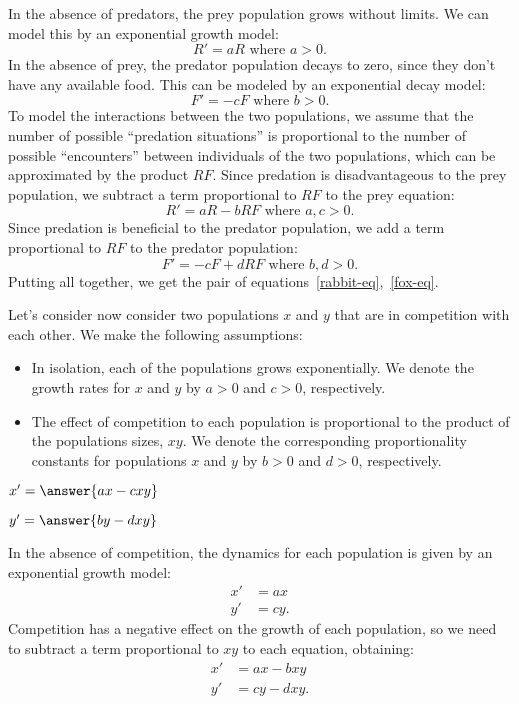 \documentclass{ximera}
\begin{document}
In the absence of predators, the prey population grows without limits. We can model this by an exponential growth model:
\[
R'=aR\text{ where $a>0$}.
\]
In the absence of prey, the predator population decays to zero, since they don't have any available food. This can be modeled by an exponential decay model:
\[
F'=-cF\text{ where $b>0$.}
\]
To model the interactions between the two populations, we assume that the number of possible ``predation situations'' is proportional to the number of possible ``encounters'' between individuals of the two populations, which can be approximated by the product $RF$.
Since predation is disadvantageous to the prey population, we subtract a term proportional to $RF$ to the prey equation:
\[
R'=aR-bRF\text{ where $a,c>0$}.
\]
Since predation is beneficial to the predator population, we add a term proportional to $RF$ to the predator population:
\[
F'=-cF+dRF\text{ where $b,d>0$.}
\]
Putting all together, we get the pair of equations~\ref{rabbit-eq},~\ref{fox-eq}.

\begin{problem}

Let's consider now consider two populations $x$ and $y$ that are in competition with each other. We make the following assumptions:
\begin{itemize}
\item In isolation, each of the populations grows exponentially. We denote the growth rates for $x$ and $y$ by $a>0$ and $c>0$, respectively. 
\item The effect of competition to each population is proportional to the product of the populations sizes, $xy$. We denote the corresponding proportionality constants for populations $x$ and $y$ by $b>0$ and $d>0$, respectively.
\end{itemize}

\begin{question}
$x'= \answer{ax-cxy}$
\end{question}
\begin{question}
$y'= \answer{by-dxy}$
\end{question}
\end{problem}

\begin{explanation} 
In the absence of competition, the dynamics for each population is given by an exponential growth model:
\begin{align*}
x'&=ax\\
y'&=cy.
\end{align*}
Competition has a negative effect on the growth of each population, so we need to subtract a term proportional to $xy$ to each equation, obtaining:
\begin{align*}
x'&=ax-bxy\\
y'&=cy-dxy.
\end{align*}
\end{explanation}
\end{document}
